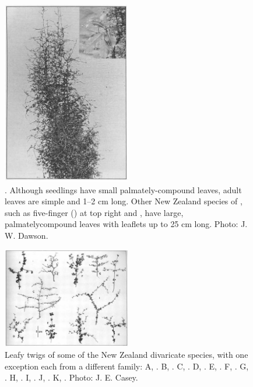 \begin{figure}
	\includegraphics[width=0.5\textwidth]{graphics/figure76pseudopanax.jpg}
	\centering
	\caption[Pseudopanax anomalus]{.
	Although seedlings have small palmately-compound leaves, adult leaves are simple and 1--2 cm long.
	Other New Zealand species of , such as five-finger () at top right and , have large, palmatelycompound leaves with leaflets up to 25 cm long. Photo:  J. W. Dawson.}%
	\label{fig:76pseudopanax}
\end{figure}

\begin{figure}
	\includegraphics[width=0.5\textwidth]{graphics/figure77twigs.jpg}
	\centering
	\caption[Leafy twigs of some of the New Zealand divaricate species]{Leafy twigs of some of the New Zealand divaricate species, with one exception each from a different family: A, .
	B, .
	C, .
	D, .
	E, .
	F, .
	G, .
	H, .
	I, .
	J, .
	K, .
	Photo:  J. E. Casey.}%
	\label{fig:77twigs}
\end{figure}

